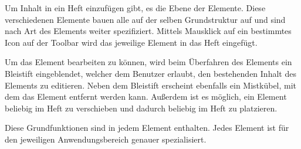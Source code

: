 \cfoot{}
Um Inhalt in ein Heft einzufügen gibt, es die Ebene der Elemente. Diese verschiedenen Elemente bauen alle auf der selben Grundstruktur auf und sind nach Art des Elements weiter spezifiziert.
Mittels Mausklick auf ein bestimmtes Icon auf der Toolbar wird das jeweilige Element in das Heft eingefügt.

Um das Element bearbeiten zu können, wird beim Überfahren des Elements ein Bleistift eingeblendet, welcher dem Benutzer erlaubt, den bestehenden Inhalt des Elements zu editieren. Neben dem Bleistift erscheint ebenfalls ein Mistkübel, mit dem das Element entfernt werden kann.
Außerdem ist es möglich, ein Element beliebig im Heft zu verschieben und dadurch beliebig im Heft zu platzieren. 

Diese Grundfunktionen sind in jedem Element enthalten. Jedes Element ist für den jeweiligen Anwendungsbereich genauer spezialisiert.